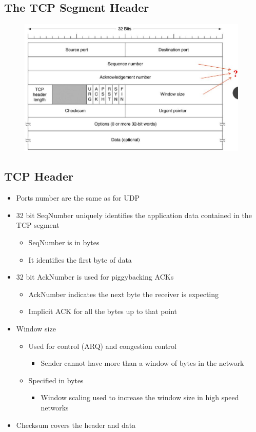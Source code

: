 \documentclass[../resumosRCOM.tex]{subfiles}
\begin{document}
\subsection{The TCP Segment Header}
\begin{figure}[h]
    \centering
    \includegraphics[width=11cm]{images/trans6.JPG}
\end{figure}

\subsection{TCP Header}
\begin{itemize}
    \item Ports number are the same as for UDP
    \item 32 bit SeqNumber uniquely identifies the application data contained in the TCP segment
    \begin{itemize}
        \item SeqNumber is in bytes
        \item It identifies the first byte of data
    \end{itemize}
    \item 32 bit AckNumber is used for piggybacking ACKs
    \begin{itemize}
        \item AckNumber indicates the next byte the receiver is expecting
        \item Implicit ACK for all the bytes up to that point
    \end{itemize}
    \item Window size
    \begin{itemize}
        \item Used for control (ARQ) and congestion control
        \begin{itemize}
            \item Sender cannot have more than a window of bytes in the network
        \end{itemize}
        \item Specified in bytes
        \begin{itemize}
            \item Window scaling used to increase the window size in high speed networks
        \end{itemize}
    \end{itemize}
    \item Checksum covers the header and data
\end{itemize}
\end{document}
